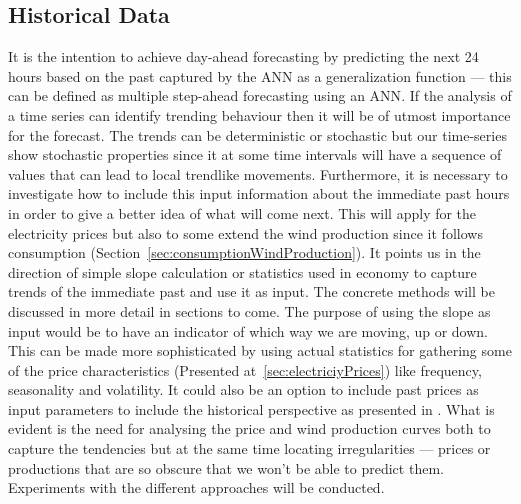 \subsection{Historical Data}
\label{sec:historicalData}
It is the intention to achieve day-ahead forecasting by predicting the next 24 hours based on the past captured by the ANN as a generalization function  --- this can be defined as multiple step-ahead forecasting using an ANN\cite[Chapter~7.1.6]{econometrics}. 
If the analysis of a time series can identify trending behaviour then it will be of utmost importance for the forecast. The trends can be deterministic or stochastic but our time-series show stochastic properties since it at some time intervals will have a sequence of values that can lead to local trendlike movements\cite[Chapter~7.3]{econometrics}. Furthermore, it is necessary to investigate how to include this input information about the immediate past hours in order to give a better idea of what will come next. This will apply for the electricity prices but also to some extend the wind production since it follows consumption (Section~\ref{sec:consumptionWindProduction}). It points us in the direction of simple slope calculation or statistics used in economy to capture trends of the immediate past and use it as input. The concrete methods will be discussed in more detail in sections to come. The purpose of using the slope as input would be to have an indicator of which way we are moving, up or down. This can be made more sophisticated by using actual statistics for gathering some of the price characteristics (Presented at~\ref{sec:electriciyPrices}) like frequency, seasonality and volatility. It could also be an option to include past prices as input parameters to include the historical perspective as presented in \cite{singhal2011electricity}.
What is evident is the need for analysing the price and wind production curves both to capture the tendencies but at the same time locating irregularities --- prices or productions that are so obscure that we won't be able to predict them. Experiments with the different approaches will be conducted.
